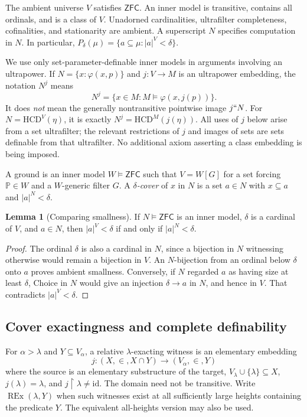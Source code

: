 \documentclass[11pt,letterpaper]{article}
\theoremstyle{definition}
\newtheorem{lemma}[definition]{Lemma}
\numberwithin{equation}{section}
\newcommand{\ZFC}{\mathsf{ZFC}}
\newcommand{\HCD}{\mathrm{HCD}}
\newcommand{\REx}{\operatorname{REx}}
\newcommand{\id}{\mathrm{id}}
\newcommand{\restr}{\mathbin{\upharpoonright}}
\newcommand{\PP}{\mathbb P}
\begin{document}
The ambient universe $V$ satisfies $\ZFC$. An inner model is transitive,
contains all ordinals, and is a class of $V$. Unadorned cardinalities,
ultrafilter completeness, cofinalities, and stationarity are ambient.
A superscript $N$ specifies computation in $N$. In particular,
$P_\delta(\mu)=\{a\subseteq\mu:|a|^V<\delta\}$.

We use only set-parameter-definable inner models in arguments involving
an ultrapower. If $N=\{x:\varphi(x,p)\}$ and $j:V\to M$ is an
ultrapower embedding, the notation $N^j$ means
\[
N^j=\{x\in M:M\models\varphi(x,j(p))\}.
\]
It does \emph{not} mean the generally nontransitive pointwise image
$j``N$. For $N=\HCD^V(\eta)$, it is exactly
$N^j=\HCD^M(j(\eta))$. All uses of $j$ below arise from a set
ultrafilter; the relevant restrictions of $j$ and images of sets are
sets definable from that ultrafilter. No additional axiom asserting a
class embedding is being imposed.

A ground is an inner model $W\models\ZFC$ such that
$V=W[G]$ for a set forcing $\PP\in W$ and a $W$-generic filter $G$.
A \emph{$\delta$-cover} of $x$ in $N$ is a set $a\in N$ with
$x\subseteq a$ and $|a|^N<\delta$.

\begin{lemma}[Comparing smallness]\label{lem:smallness}
If $N\models\ZFC$ is an inner model, $\delta$ is a cardinal of $V$,
and $a\in N$, then $|a|^V<\delta$ if and only if $|a|^N<\delta$.
\end{lemma}
\begin{proof}
The ordinal $\delta$ is also a cardinal in $N$, since a bijection in
$N$ witnessing otherwise would remain a bijection in $V$. An
$N$-bijection from an ordinal below $\delta$ onto $a$ proves ambient
smallness. Conversely, if $N$ regarded $a$ as having size at least
$\delta$, Choice in $N$ would give an injection $\delta\to a$ in $N$,
and hence in $V$. That contradicts $|a|^V<\delta$.
\end{proof}

\subsection{Cover exactingness and complete definability}

For $\alpha>\lambda$ and $Y\subseteq V_\alpha$, a relative
$\lambda$-exacting witness is an elementary embedding
\[
j:(X,\in,X\cap Y)\longrightarrow(V_\alpha,\in,Y)
\]
where the source is an elementary substructure of the target,
$V_\lambda\cup\{\lambda\}\subseteq X$, $j(\lambda)=\lambda$, and
$j\restr\lambda\ne\id$. The domain need not be transitive. Write
$\REx(\lambda,Y)$ when such witnesses exist at all sufficiently large
heights containing the predicate $Y$. The equivalent all-heights
version may also be used.
\end{document}
